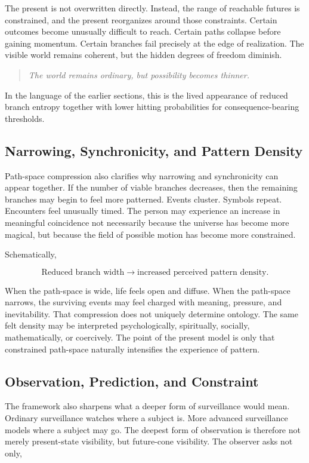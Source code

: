 \documentclass[12pt]{article}
\begin{document}
The present is not overwritten directly. Instead, the range of reachable futures is constrained, and the present reorganizes around those constraints. Certain outcomes become unusually difficult to reach. Certain paths collapse before gaining momentum. Certain branches fail precisely at the edge of realization. The visible world remains coherent, but the hidden degrees of freedom diminish.

\begin{quote}
\textit{The world remains ordinary, but possibility becomes thinner.}
\end{quote}

In the language of the earlier sections, this is the lived appearance of reduced branch entropy together with lower hitting probabilities for consequence-bearing thresholds.

\subsection{Narrowing, Synchronicity, and Pattern Density}

Path-space compression also clarifies why narrowing and synchronicity can appear together. If the number of viable branches decreases, then the remaining branches may begin to feel more patterned. Events cluster. Symbols repeat. Encounters feel unusually timed. The person may experience an increase in meaningful coincidence not necessarily because the universe has become more magical, but because the field of possible motion has become more constrained.

Schematically,

\[
\text{Reduced branch width} \longrightarrow \text{increased perceived pattern density}.
\]

When the path-space is wide, life feels open and diffuse. When the path-space narrows, the surviving events may feel charged with meaning, pressure, and inevitability. That compression does not uniquely determine ontology. The same felt density may be interpreted psychologically, spiritually, socially, mathematically, or coercively. The point of the present model is only that constrained path-space naturally intensifies the experience of pattern.

\subsection{Observation, Prediction, and Constraint}

The framework also sharpens what a deeper form of surveillance would mean. Ordinary surveillance watches where a subject is. More advanced surveillance models where a subject may go. The deepest form of observation is therefore not merely present-state visibility, but future-cone visibility. The observer asks not only,
\end{document}
